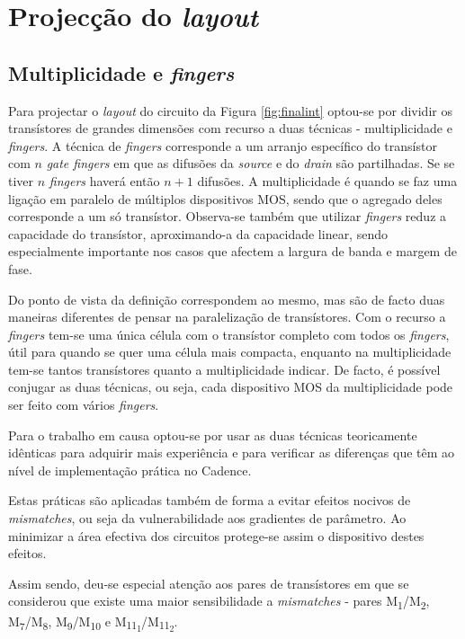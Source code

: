 \documentclass[11pt]{article}
\numberwithin{equation}{section}
\begin{document}
\section{Projecção do \textit{layout}}

\subsection{Multiplicidade e \textit{fingers}}

Para projectar o \textit{layout} do circuito da Figura \ref{fig:finalint} optou-se por dividir os transístores de grandes dimensões com recurso a duas técnicas - multiplicidade e \textit{fingers}. A técnica de \textit{fingers} corresponde a um arranjo específico do transístor com $n$ \textit{gate fingers} em que as difusões da \textit{source} e do \textit{drain} são partilhadas. Se se tiver $n$ \textit{fingers} haverá então $n+1$ difusões. A multiplicidade é quando se faz uma ligação em paralelo de múltiplos dispositivos MOS, sendo que o agregado deles corresponde a um só transístor. Observa-se também que utilizar \textit{fingers} reduz a capacidade do transístor, aproximando-a da capacidade linear, sendo especialmente importante nos casos que afectem a largura de banda e margem de fase. 

Do ponto de vista da definição correspondem ao mesmo, mas são de facto duas maneiras diferentes de pensar na paralelização de transístores. Com o recurso a \textit{fingers} tem-se uma única célula com o transístor completo com todos os \textit{fingers}, útil para quando se quer uma célula mais compacta, enquanto na multiplicidade tem-se tantos transístores quanto a multiplicidade indicar. De facto, é possível conjugar as duas técnicas, ou seja, cada dispositivo MOS da multiplicidade pode ser feito com vários \textit{fingers}.

Para o trabalho em causa optou-se por usar as duas técnicas teoricamente idênticas para adquirir mais experiência e para verificar as diferenças que têm ao nível de implementação prática no Cadence.

Estas práticas são aplicadas também de forma a evitar  efeitos nocivos de \textit{mismatches}, ou seja da vulnerabilidade aos gradientes de parâmetro. Ao minimizar a área efectiva dos circuitos protege-se assim o dispositivo destes efeitos.

Assim sendo, deu-se especial atenção aos pares de transístores em que se considerou que existe uma maior sensibilidade a \textit{mismatches} - pares M\textsubscript{1}/M\textsubscript{2}, M\textsubscript{7}/M\textsubscript{8}, M\textsubscript{9}/M\textsubscript{10} e M\textsubscript{11\textsubscript{1}}/M\textsubscript{11\textsubscript{2}}. 
\end{document}
